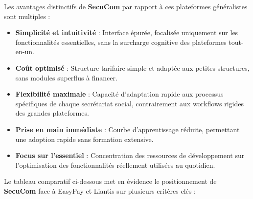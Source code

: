 \vspace{1cm}

\begin{tcolorbox}[
  title={\textbf{Avantages distinctifs de SecuCom}},
  colback=blue!5!white,
  colframe=primarycolor,
  fonttitle=\bfseries,
  boxrule=0.5mm,
  arc=2mm,
  left=6mm,
  right=6mm,
  top=6mm,
  bottom=6mm
]
\noindent Les avantages distinctifs de \textbf{SecuCom} par rapport à ces plateformes généralistes sont multiples :

\begin{itemize}[leftmargin=*,label=\textcolor{darkgray}{$\bullet$},itemsep=0.3em]
  \item \textbf{Simplicité et intuitivité} : Interface épurée, focalisée uniquement sur les fonctionnalités essentielles, sans la surcharge cognitive des plateformes tout-en-un.
  \item \textbf{Coût optimisé} : Structure tarifaire simple et adaptée aux petites structures, sans modules superflus à financer.
  \item \textbf{Flexibilité maximale} : Capacité d'adaptation rapide aux processus spécifiques de chaque secrétariat social, contrairement aux workflows rigides des grandes plateformes.
  \item \textbf{Prise en main immédiate} : Courbe d'apprentissage réduite, permettant une adoption rapide sans formation extensive.
  \item \textbf{Focus sur l'essentiel} : Concentration des ressources de développement sur l'optimisation des fonctionnalités réellement utilisées au quotidien.
\end{itemize}
\end{tcolorbox}

\vspace{0.5cm}

\newpage
\noindent Le tableau comparatif ci-dessous met en évidence le positionnement de \textbf{SecuCom} face à EasyPay et Liantis sur plusieurs critères clés :

